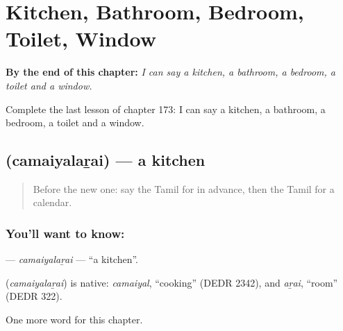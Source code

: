 
\chapter{Kitchen, Bathroom, Bedroom, Toilet, Window}
\label{ch:ta-kitchen-bathroom-bedroom-toilet-window}

\begin{chapteropening}
\textbf{By the end of this chapter:} \emph{I can say a kitchen, a bathroom, a bedroom, a toilet and a window.}

Complete the last lesson of chapter 173: I can say a kitchen, a bathroom, a bedroom, a toilet and a window.
\end{chapteropening}

\section[\texorpdfstring{\ta{சமையலறை} (camaiyalaṟai)}{சமையலறை (camaiyalaṟai)}]{ (camaiyalaṟai) — a kitchen}

\label{lesson:TA-C173-camaiyalarai}



\begin{quote}
Before the new one: say the Tamil for in advance, then the Tamil for a calendar.
\end{quote}

\subsection*{You'll want to know: }
\textbf{} — \emph{camaiyalaṟai} — \textquotedblleft{}a kitchen\textquotedblright{}.

\begin{cousinweb}
\textbf{} (\emph{camaiyalaṟai}) is native: \emph{camaiyal}, \textquotedblleft{}cooking\textquotedblright{} (DEDR 2342), and \emph{aṟai}, \textquotedblleft{}room\textquotedblright{} (DEDR 322).
\end{cousinweb}

\begin{grammarlens}[title={What you've built}]
One more word for this chapter.
\end{grammarlens}

